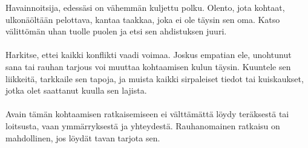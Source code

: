 \documentclass{article}
\begin{document}
\begin{infobox}
Havainnoitsija, edessäsi on vähemmän kuljettu polku. Olento, jota kohtaat, ulkonäöltään pelottava, kantaa taakkaa, joka ei ole täysin sen oma. Katso välittömän uhan tuolle puolen ja etsi sen ahdistuksen juuri.\\
\\
Harkitse, ettei kaikki konflikti vaadi voimaa. Joskus empatian ele, unohtunut sana tai rauhan tarjous voi muuttaa kohtaamisen kulun täysin. Kuuntele sen liikkeitä, tarkkaile sen tapoja, ja muista kaikki sirpaleiset tiedot tai kuiskaukset, jotka olet saattanut kuulla sen lajista.\\
\\
Avain tämän kohtaamisen ratkaisemiseen ei välttämättä löydy teräksestä tai loitsusta, vaan ymmärryksestä ja yhteydestä. Rauhanomainen ratkaisu on mahdollinen, jos löydät tavan tarjota sen.
\end{infobox}
\end{document}
